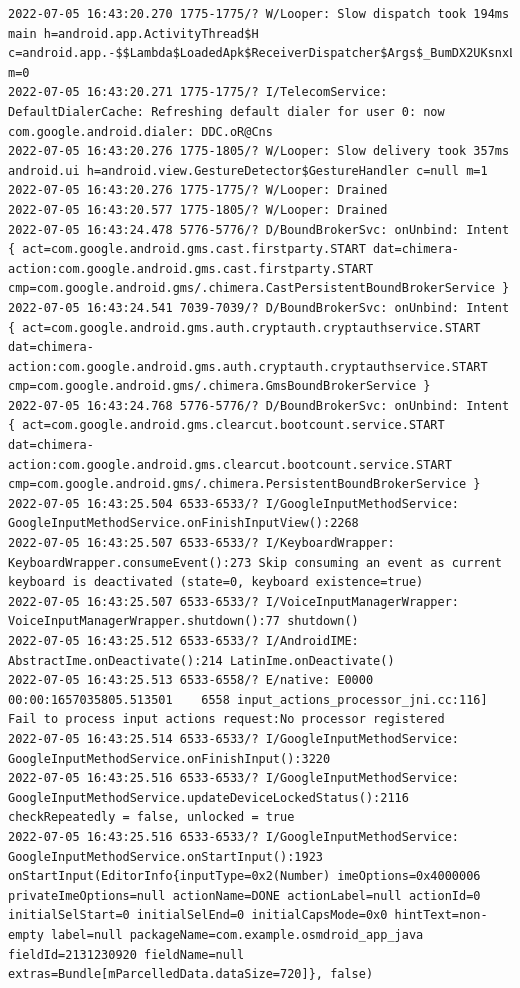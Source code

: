 \documentclass[a4paper,12pt]{book}
\begin{document}
\begin{lstlisting}
2022-07-05 16:43:20.270 1775-1775/? W/Looper: Slow dispatch took 194ms main h=android.app.ActivityThread$H c=android.app.-$$Lambda$LoadedApk$ReceiverDispatcher$Args$_BumDX2UKsnxLVrE6UJsJZkotuA@3103657 m=0
2022-07-05 16:43:20.271 1775-1775/? I/TelecomService: DefaultDialerCache: Refreshing default dialer for user 0: now com.google.android.dialer: DDC.oR@Cns
2022-07-05 16:43:20.276 1775-1805/? W/Looper: Slow delivery took 357ms android.ui h=android.view.GestureDetector$GestureHandler c=null m=1
2022-07-05 16:43:20.276 1775-1775/? W/Looper: Drained
2022-07-05 16:43:20.577 1775-1805/? W/Looper: Drained
2022-07-05 16:43:24.478 5776-5776/? D/BoundBrokerSvc: onUnbind: Intent { act=com.google.android.gms.cast.firstparty.START dat=chimera-action:com.google.android.gms.cast.firstparty.START cmp=com.google.android.gms/.chimera.CastPersistentBoundBrokerService }
2022-07-05 16:43:24.541 7039-7039/? D/BoundBrokerSvc: onUnbind: Intent { act=com.google.android.gms.auth.cryptauth.cryptauthservice.START dat=chimera-action:com.google.android.gms.auth.cryptauth.cryptauthservice.START cmp=com.google.android.gms/.chimera.GmsBoundBrokerService }
2022-07-05 16:43:24.768 5776-5776/? D/BoundBrokerSvc: onUnbind: Intent { act=com.google.android.gms.clearcut.bootcount.service.START dat=chimera-action:com.google.android.gms.clearcut.bootcount.service.START cmp=com.google.android.gms/.chimera.PersistentBoundBrokerService }
2022-07-05 16:43:25.504 6533-6533/? I/GoogleInputMethodService: GoogleInputMethodService.onFinishInputView():2268 
2022-07-05 16:43:25.507 6533-6533/? I/KeyboardWrapper: KeyboardWrapper.consumeEvent():273 Skip consuming an event as current keyboard is deactivated (state=0, keyboard existence=true)
2022-07-05 16:43:25.507 6533-6533/? I/VoiceInputManagerWrapper: VoiceInputManagerWrapper.shutdown():77 shutdown()
2022-07-05 16:43:25.512 6533-6533/? I/AndroidIME: AbstractIme.onDeactivate():214 LatinIme.onDeactivate()
2022-07-05 16:43:25.513 6533-6558/? E/native: E0000 00:00:1657035805.513501    6558 input_actions_processor_jni.cc:116] Fail to process input actions request:No processor registered
2022-07-05 16:43:25.514 6533-6533/? I/GoogleInputMethodService: GoogleInputMethodService.onFinishInput():3220 
2022-07-05 16:43:25.516 6533-6533/? I/GoogleInputMethodService: GoogleInputMethodService.updateDeviceLockedStatus():2116 checkRepeatedly = false, unlocked = true
2022-07-05 16:43:25.516 6533-6533/? I/GoogleInputMethodService: GoogleInputMethodService.onStartInput():1923 onStartInput(EditorInfo{inputType=0x2(Number) imeOptions=0x4000006 privateImeOptions=null actionName=DONE actionLabel=null actionId=0 initialSelStart=0 initialSelEnd=0 initialCapsMode=0x0 hintText=non-empty label=null packageName=com.example.osmdroid_app_java fieldId=2131230920 fieldName=null extras=Bundle[mParcelledData.dataSize=720]}, false)

\end{lstlisting}
\end{document}
